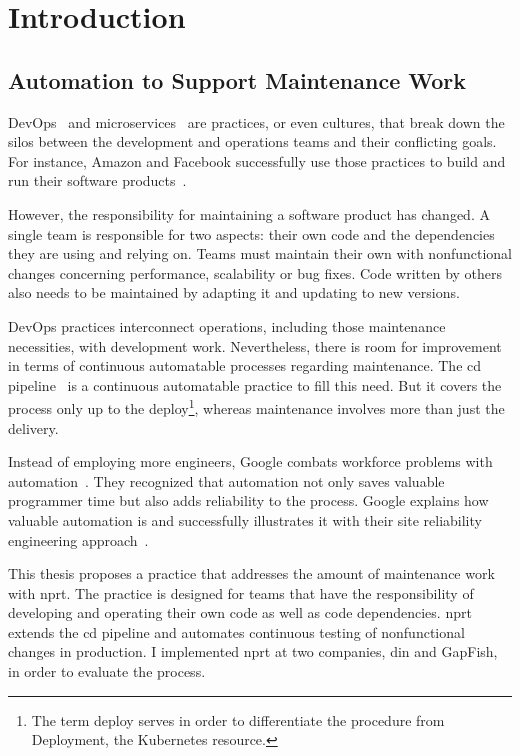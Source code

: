 \chapter{Introduction}
\label{chap:intro}
\section{Automation to Support Maintenance Work}

DevOps~\cite{devops_definition} and microservices~\cite{microservices_fowler} are
practices, or even cultures, that break down the silos between the development and
operations teams and their conflicting goals. For instance, Amazon and Facebook successfully
use those practices to build and run their software products~\cite{build_run,dev_at_fb}.

However, the responsibility for maintaining a software product has changed. A single team is
responsible for two aspects: their own code and the dependencies they are using and relying
on. Teams must maintain their own with nonfunctional changes
concerning performance, scalability or bug fixes. Code written by others also needs to be
maintained by adapting it and updating to new versions.

DevOps practices interconnect operations, including those maintenance necessities, with
development work. Nevertheless, there is room for improvement in terms of continuous
automatable processes regarding maintenance. The \gls{cd}
pipeline~\cite{cd_humble_pipeline} is a continuous automatable practice to fill this
need. But it covers the process only up to the deploy\footnote{The term deploy serves in
  order to differentiate the procedure from Deployment, the Kubernetes resource.}, whereas
maintenance involves more than just the delivery.

Instead of employing more engineers, Google combats workforce problems with
automation~\cite{sre_automation}. They recognized that automation not only saves
valuable programmer time but also adds reliability to the process. Google explains
how valuable automation is and successfully illustrates it with their site reliability
engineering approach~\cite{sre_intro}.

This thesis proposes a practice that addresses the amount of maintenance
work with \gls{nprt}. The practice is designed for teams that have the responsibility of developing and
operating their own code as well as code dependencies. \gls{nprt} extends the \gls{cd}
pipeline and automates continuous testing of nonfunctional changes in production. I
implemented \gls{nprt} at two companies, \gls{din} and GapFish, in order to
evaluate the process.

